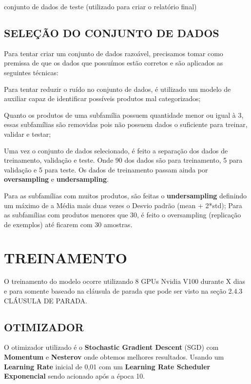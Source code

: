 conjunto de dados de teste (utilizado para criar o relatório final)

\subsection{SELEÇÃO DO CONJUNTO DE DADOS}

Para tentar criar um conjunto de dados razoável, precisamos tomar como premissa de que os dados que possuímos estão corretos e são aplicados as seguintes técnicas:

Para tentar reduzir o ruído no conjunto de dados, é utilizado um modelo de auxiliar capaz de identificar possíveis produtos mal categorizados;

Quanto os produtos de uma subfamília possuem quantidade menor ou igual à 3, essas subfamílias são removidas pois não possuem dados o suficiente para treinar, validar e testar;

Uma vez o conjunto de dados selecionado, é feito a separação dos dados de treinamento, validação e teste. Onde 90 dos dados são para treinamento, 5 para validação e 5 para teste. Os dados de treinamento passam ainda por \textbf{oversampling} e \textbf{undersampling}.

Para as subfamílias com muitos produtos, são feitas o \textbf{undersampling} definindo um máximo de a Média mais duas vezes o Desvio padrão (mean + 2*std);
Para as subfamílias com produtos menores que 30, é feito o oversampling (replicação de exemplos) até ficarem com 30 amostras.



\section{TREINAMENTO}

O treinamento do modelo ocorre utilizando 8 GPUs Nvidia V100 durante X dias e para somente baseado na cláusula de parada que pode ser visto na seção 2.4.3 CLÁUSULA DE PARADA. 

\subsection{OTIMIZADOR}

O otimizador utilizado é o \textbf{Stochastic Gradient Descent} (SGD) com \textbf{Momentum} e \textbf{Nesterov} onde obtemos melhores resultados. Usando um \textbf{Learning Rate} inicial de 0,01 com um \textbf{Learning Rate Scheduler Exponencial} sendo acionado após a época 10.

